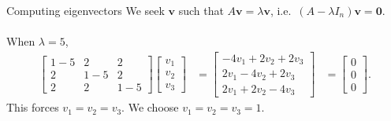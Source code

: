 \documentclass[handout]{beamer}
\def\v{\bm{v}}
\begin{document}
        \begin{frame}{Computing eigenvectors}
                We seek $\v$ such that $A\v = \lambda\v$, i.e.\ $(A - \lambda I_n)\v = \mathbf{0}$. \\~\\

                When $\lambda = 5$,
                \begin{align*}
                        \begin{bmatrix}
                                1 - 5 & 2 & 2 \\ 2 & 1 - 5 & 2 \\ 2 & 2 & 1 - 5
                        \end{bmatrix}
                        \begin{bmatrix}
                                v_{1} \\ v_{2} \\ v_{3}
                        \end{bmatrix}
                        &= \begin{bmatrix}
                                -4v_1 + 2v_2 + 2v_3 \\
                                2v_1 - 4v_2 + 2v_3 \\
                                2v_1 + 2v_2 - 4v_3
                        \end{bmatrix}
                        &= \begin{bmatrix}
                                0 \\ 0 \\ 0
                        \end{bmatrix}.
                \end{align*}
                This forces $v_1 = v_2 = v_3$. We choose $v_1 = v_2 = v_3 = 1$.
        \end{frame}
        
\end{document}
